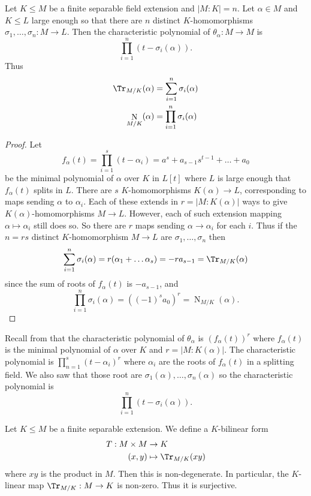 \documentclass[a4paper]{article}
\DeclareMathOperator{\n}{N}
\begin{document}
\begin{theorem}
  \label{thm:trace and norm of separable extension}
  Let \(K \leq M\) be a finite separable field extension and \(|M:K| = n\). Let \(\alpha \in M\) and \(K \leq L\) large enough so that there are \(n\) distinct \(K\)-homomorphisms \(\sigma_1, \dots, \sigma_n: M \to L\). Then the characteristic polynomial of \(\theta_\alpha: M \to M\) is
  \[
    \prod_{i = 1}^{n}(t - \sigma_i(\alpha)).
  \]
  Thus
  \begin{align*}
    \Tr_{M/K}(\alpha) &= \sum_{i = 1}^{n} \sigma_i(\alpha) \\
    \n_{M/K}(\alpha) &= \prod_{i = 1}^{n} \sigma_i(\alpha)
  \end{align*}
\end{theorem}

\begin{proof}
  Let
  \[
    f_\alpha(t) = \prod_{i = 1}^{s} (t - \alpha_i) = a^s + a_{s - 1}s^{t - 1} + \dots + a_0
  \]
  be the minimal polynomial of \(\alpha\) over \(K\) in \(L[t]\) where \(L\) is large enough that \(f_\alpha(t)\) splits in \(L\). There are \(s\) \(K\)-homomorphisms \(K(\alpha) \to L\), corresponding to maps sending \(\alpha\) to \(\alpha_i\). Each of these extends in \(r = |M:K(\alpha)|\) ways to give \(K(\alpha)\)-homomorphisms \(M \to L\). However, each of such extension mapping \(\alpha \mapsto \alpha_i\) still does so. So there are \(r\) maps sending \(\alpha \to \alpha_i\) for each \(i\). Thus if the \(n = rs\) distinct \(K\)-homomorphism \(M \to L\) are \(\sigma_1, \dots, \sigma_n\) then
  \[
    \sum_{i = 1}^{n} \sigma_i(\alpha) = r(\alpha_1 + \dots \alpha_s) = -ra_{s - 1} = \Tr_{M/K} (\alpha)
  \]
  since the sum of roots of \(f_\alpha(t)\) is \(-a_{s - 1}\), and
  \[
    \prod_{i = 1}^{n} \sigma_i(\alpha) = ((-1)^s a_0)^r = \n_{M/K}(\alpha).
  \]
\end{proof}

%
%
%
%
%
Recall from  that the characteristic polynomial of \(\theta_\alpha\) is \((f_\alpha(t))^r\) where \(f_\alpha(t)\) is the minimal polynomial of \(\alpha\) over \(K\) and \(r = |M:K(\alpha)|\). The characteristic polynomial is \(\prod_{n = 1}^{s} (t - \alpha_i)^r\) where \(\alpha_i\) are the roots of \(f_\alpha(t)\) in a splitting field. We also saw that those root are \(\sigma_1(\alpha), \dots, \sigma_n(\alpha)\) so the characteristic polynomial is
\[
  \prod_{i = 1}^{n} (t - \sigma_i(\alpha)).
\]

\begin{theorem}
  \label{thm:vandermonde}
  Let \(K \leq M\) be a finite separable extension. We define a \(K\)-bilinear form
  \begin{align*}
    T: M \times M &\to K \\
    (x, y) &\mapsto \Tr_{M/K}(xy)
  \end{align*}
  where \(xy\) is the product in \(M\). Then this is non-degenerate. In particular, the \(K\)-linear map \(\Tr_{M/K}: M \to K\) is non-zero. Thus it is surjective.
\end{theorem}
\end{document}
